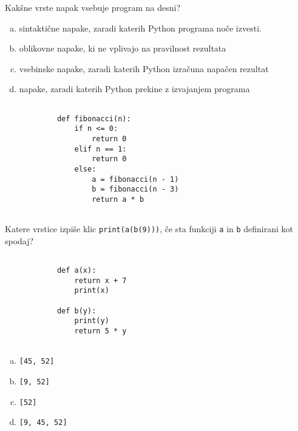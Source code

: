 \documentclass[arhiv, 10pt]{../izpit}
\newcommand{\inlinepy}[1]{\texttt{#1}}
\begin{document}
        \naloga*
        \begin{multicols}{2}
        \noindent
        Kakšne vrste napak vsebuje program na desni?

        \begin{enumerate}[(a)]
\item sintaktične napake, zaradi katerih Python programa noče izvesti.
\item oblikovne napake, ki ne vplivajo na pravilnost rezultata
\item vsebinske napake, zaradi katerih Python izračuna napačen rezultat
\item napake, zaradi katerih Python prekine z izvajanjem programa
\end{enumerate}

        \columnbreak

        \begin{verbatim}
        
            def fibonacci(n):
                if n <= 0:
                    return 0
                elif n == 1:
                    return 0
                else:
                    a = fibonacci(n - 1)
                    b = fibonacci(n - 3)
                    return a * b
            
        \end{verbatim}

        \end{multicols}

    
        \naloga*
        Katere vrstice izpiše klic \inlinepy{print(a(b(9)))}, če sta funkciji \inlinepy{a} in \inlinepy{b} definirani kot spodaj?

        \begin{multicols}{2}
        \begin{verbatim}
        
            def a(x):
                return x + 7
                print(x)

            def b(y):
                print(y)
                return 5 * y
        
        \end{verbatim}

        \begin{enumerate}[(a)]
\item \inlinepy{[45, 52]}
\item \inlinepy{[9, 52]}
\item \inlinepy{[52]}
\item \inlinepy{[9, 45, 52]}
\end{enumerate}

        \end{multicols}
    
\end{document}
